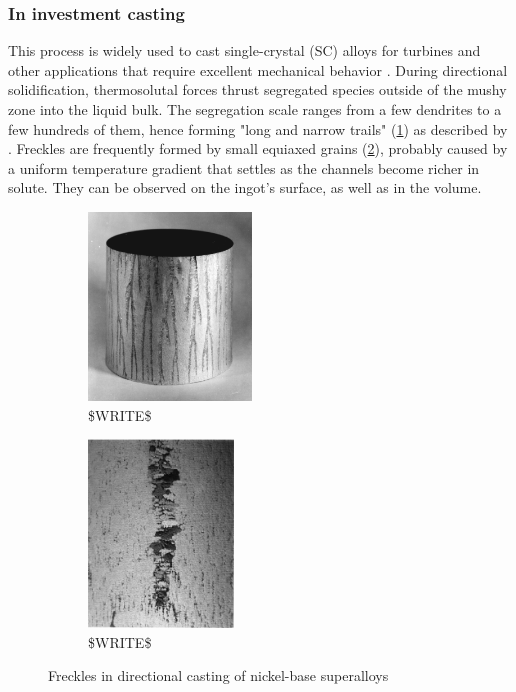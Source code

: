 \subsubsection*{In investment casting}
This process is widely used to cast single-crystal (SC) alloys for turbines and other applications that require excellent mechanical behavior \citep{giamei_nature_1970}.
During directional solidification, thermosolutal forces thrust segregated species outside of the mushy zone into the liquid bulk.
The segregation scale ranges from a few dendrites to a few hundreds of them, hence forming "long and narrow trails" (\cref{fig:freckle1}) as described by \citet{felicelli_simulation_1991}. Freckles are frequently formed by small equiaxed grains (\cref{fig:freckle2}), probably caused by a uniform temperature gradient 
that settles as the channels become richer in solute. They can be observed on the ingot's surface, as well as in the volume.
\begin{figure}[htbp]
\centering
  \begin{subfigure}[t]{0.25\textwidth}
    \centering
	\includegraphics[height=5cm]{Chapter0/Graphics/freckle1.png}
	\caption{\$WRITE\$}
    \label{fig:freckle1}
  \end{subfigure}
   \qquad %
   \begin{subfigure}[t]{0.25\textwidth}
    \centering
	\includegraphics[height=5cm]{Chapter0/Graphics/freckle2.png}
	\caption{\$WRITE\$}
    \label{fig:freckle2}
  \end{subfigure}
\caption{Freckles in directional casting of nickel-base superalloys} 
\label{fig:freckle}
\end{figure}
